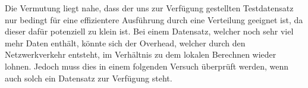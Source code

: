 Die Vermutung liegt nahe, dass der uns zur Verfügung gestellten Testdatensatz nur bedingt für eine effizientere
Ausführung durch eine Verteilung geeignet ist, da dieser dafür potenziell zu klein ist. Bei einem Datensatz, welcher
noch sehr viel mehr Daten enthält, könnte sich der Overhead, welcher durch den Netzwerkverkehr entsteht, im Verhältnis
zu dem lokalen Berechnen wieder lohnen. Jedoch muss dies in einem folgenden Versuch überprüft werden, wenn auch solch
ein Datensatz zur Verfügung steht.
